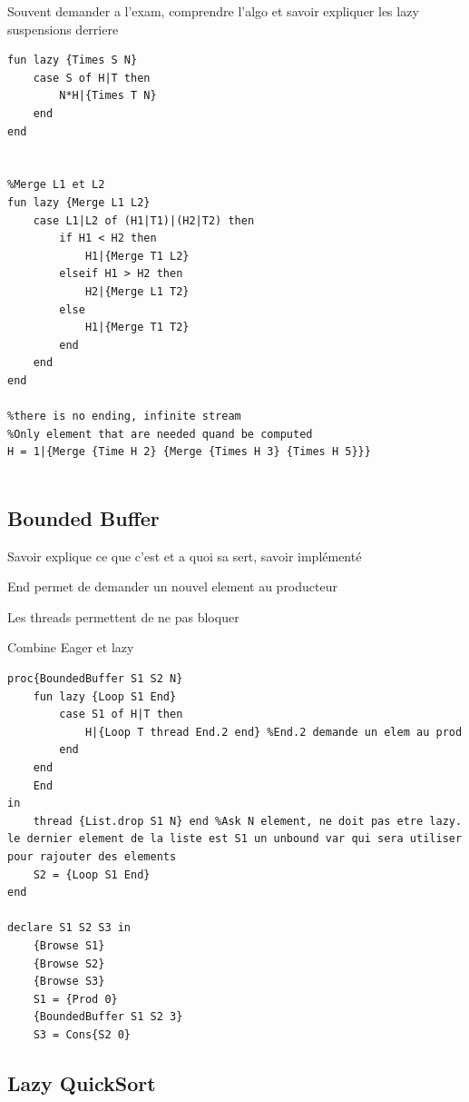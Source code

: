 \documentclass[a4paper,12pt]{scrartcl}
\begin{document}
	Souvent demander a l'exam, comprendre l'algo et savoir expliquer les lazy suspensions derriere
	
	\begin{lstlisting}[language=OZ]
%Multiplie L par N
fun lazy {Times S N}
	case S of H|T then
		N*H|{Times T N}
	end
end


%Merge L1 et L2
fun lazy {Merge L1 L2}
	case L1|L2 of (H1|T1)|(H2|T2) then
		if H1 < H2 then
			H1|{Merge T1 L2}
		elseif H1 > H2 then
			H2|{Merge L1 T2}
		else
			H1|{Merge T1 T2}
		end
	end
end

%there is no ending, infinite stream
%Only element that are needed quand be computed
H = 1|{Merge {Time H 2} {Merge {Times H 3} {Times H 5}}}
	
	 \end{lstlisting}
	 
	 \subsection{Bounded Buffer}
	 	Savoir explique ce que c'est et a quoi sa sert, savoir implémenté
	 	
	 	End permet de demander un nouvel element au producteur
	 	
	 	Les threads permettent de ne pas bloquer
	 	
	 	Combine Eager et lazy
	 	
	 	
	 	\begin{lstlisting}[language=OZ]
%Can be inserted between prod-Cons pipeline whitout changing code
proc{BoundedBuffer S1 S2 N}
	fun lazy {Loop S1 End}
		case S1 of H|T then
			H|{Loop T thread End.2 end} %End.2 demande un elem au prod
		end
	end
	End
in
	thread {List.drop S1 N} end %Ask N element, ne doit pas etre lazy. le dernier element de la liste est S1 un unbound var qui sera utiliser pour rajouter des elements
	S2 = {Loop S1 End}
end

declare S1 S2 S3 in
	{Browse S1}
	{Browse S2}
	{Browse S3}
	S1 = {Prod 0}
	{BoundedBuffer S1 S2 3}
	S3 = Cons{S2 0}
	 	\end{lstlisting}
	 	
	\subsection{Lazy QuickSort}
	
\end{document}
